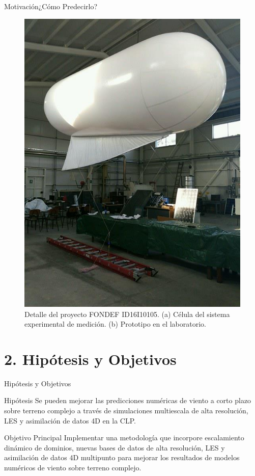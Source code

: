 \documentclass[mathserif]{beamer}
\begin{document}
\begin{frame}{Motivación}{¿Cómo Predecirlo?}
\begin{figure}
\begin{minipage}{0.5\linewidth}
			\includegraphics[width=0.7\linewidth,trim={0cm 0cm 0cm 0cm},clip]{fig/01/prototipo}
		\end{minipage}%
		\caption{Detalle del proyecto FONDEF ID16I10105. (a) Célula del sistema experimental de medición. (b) Prototipo en el laboratorio.}
		\label{fig:01_detalle_fondef}
	\end{figure}
\end{frame}

\section{2. Hipótesis y Objetivos}
\begin{frame}{Hipótesis y Objetivos}
	\begin{block}{Hipótesis}\justifying
		Se pueden mejorar las predicciones numéricas de viento a corto plazo sobre terreno complejo a través de simulaciones multiescala de alta resolución, LES y asimilación de datos 4D en la CLP.
	\end{block}
	\begin{block}{Objetivo Principal}\justifying
		Implementar una metodología que incorpore escalamiento dinámico de dominios, nuevas bases de datos de alta resolución, LES y asimilación de datos 4D multipunto para mejorar los resultados de modelos numéricos de viento sobre terreno complejo.
	\end{block}
\end{frame}
\end{document}
